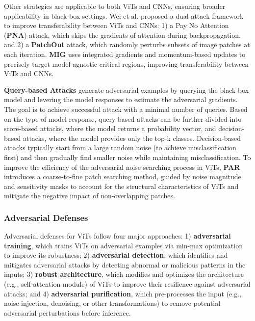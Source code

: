 Other strategies are applicable to both ViTs and CNNs, ensuring broader applicability in black-box settings.
Wei et al.\cite{wei2022towards, wei2023towards} proposed a dual attack framework to improve transferability between ViTs and CNNs: 1) a Pay No Attention (\textbf{PNA}) attack, which skips the gradients of attention during backpropagation, and 2) a \textbf{PatchOut} attack, which randomly perturbs subsets of image patches at each iteration.
\textbf{MIG}\cite{ma2023transferable} uses integrated gradients and momentum-based updates to precisely target model-agnostic critical regions, improving transferability between ViTs and CNNs.


\textbf{Query-based Attacks} generate adversarial examples by querying the black-box model and levering the model responses to estimate the adversarial gradients. The goal is to achieve successful attack with a minimal number of queries. Based on the type of model response, query-based attacks can be further divided into score-based attacks, where the model returns a probability vector, and decision-based attacks, where the model provides only the top-k classes. Decision-based attacks typically start from a large random noise (to achieve misclassification first) and then gradually find smaller noise while maintaining misclassification.
To improve the efficiency of the adversarial noise searching process in ViTs, \textbf{PAR}~\cite{shi2022decision} introduces a coarse-to-fine patch searching method, guided by noise magnitude and sensitivity masks to account for the structural characteristics of ViTs and mitigate the negative impact of non-overlapping patches.



\subsubsection{Adversarial Defenses}\label{sec:ViT-advdefense}
Adversarial defenses for ViTs follow four major approaches: 1) \textbf{adversarial training}, which trains ViTs on adversarial examples via min-max optimization to improve its robustness; 2) \textbf{adversarial detection}, which identifies and mitigates adversarial attacks by detecting abnormal or malicious patterns in the inputs; 3) \textbf{robust architecture}, which modifies and optimizes the architecture (e.g., self-attention module) of ViTs to improve their resilience against adversarial attacks; and 4) \textbf{adversarial purification}, which pre-processes the input (e.g., noise injection, denoising, or other transformations) to remove potential adversarial perturbations before inference.



